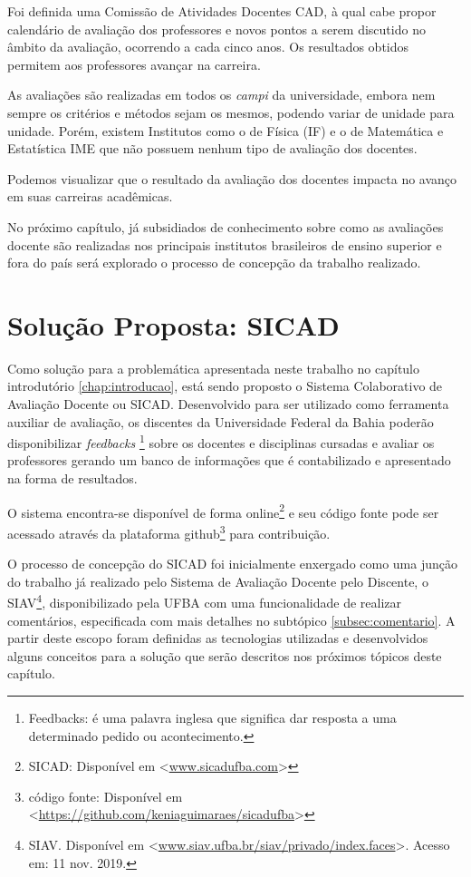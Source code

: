 \documentclass[12pt, a4paper]{report}
\begin{document}
Foi definida uma Comissão de Atividades Docentes \ac{CAD}, à qual cabe propor calendário de avaliação dos professores e novos pontos a serem discutido no âmbito da avaliação, ocorrendo a cada cinco anos. Os resultados obtidos permitem aos professores avançar na carreira.

As avaliações são realizadas em todos os \textit{campi} da universidade, embora nem sempre os critérios e métodos sejam os mesmos, podendo variar de unidade para unidade. Porém, existem Institutos como o de Física (IF) e o de Matemática e Estatística \ac{IME} que não possuem nenhum tipo de avaliação dos docentes.

Podemos visualizar que o resultado da avaliação dos docentes impacta no avanço em suas carreiras acadêmicas.

No próximo capítulo, já subsidiados de conhecimento sobre como as avaliações docente são realizadas nos principais institutos brasileiros de ensino superior e fora do país será explorado o processo de concepção da trabalho realizado.


\chapter{Solução Proposta: SICAD}
\label{chap:solucaoproposta}

Como solução para a problemática apresentada neste trabalho no capítulo introdutório \ref{chap:introducao}, está sendo proposto o Sistema Colaborativo de Avaliação Docente ou \ac{SICAD}. Desenvolvido para ser utilizado como ferramenta auxiliar de avaliação, os discentes da Universidade Federal da Bahia poderão disponibilizar \textit{feedbacks} \footnote{Feedbacks: é uma palavra inglesa que significa dar resposta a uma determinado pedido ou acontecimento.} sobre os docentes e disciplinas cursadas e avaliar os professores gerando um banco de informações que é contabilizado e apresentado na forma de resultados. 

O sistema encontra-se disponível de forma online\footnote{SICAD: Disponível em <\url{www.sicadufba.com}>} e seu código fonte pode ser acessado através da plataforma github\footnote{código fonte: Disponível em <\url{https://github.com/keniaguimaraes/sicadufba}>} para contribuição.

O processo de concepção do \ac{SICAD} foi inicialmente enxergado como uma junção do trabalho já realizado pelo Sistema de Avaliação Docente pelo Discente, o \ac{SIAV}\footnote{SIAV. Disponível em <\url{www.siav.ufba.br/siav/privado/index.faces}>. Acesso em: 11 nov. 2019.}, disponibilizado pela \ac{UFBA} com uma funcionalidade de realizar comentários, especificada com mais detalhes no subtópico \ref{subsec:comentario}. A partir deste escopo foram definidas as tecnologias utilizadas e desenvolvidos alguns conceitos para a solução que serão descritos nos próximos tópicos deste capítulo.
\end{document}
